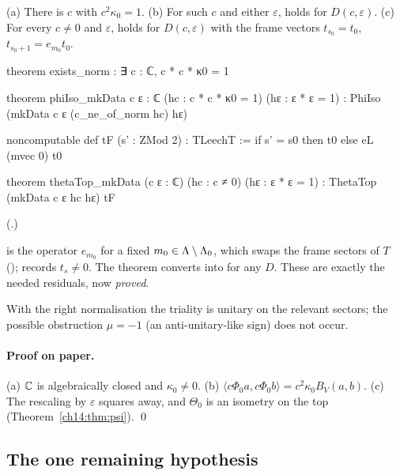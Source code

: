 \begin{theorem}\label{ch14:thm:isomk}
(a) There is $c$ with $c^2\kappa_0=1$.  (b) For such $c$ and either $\varepsilon$,  holds for
$D(c,\varepsilon)$.  (c) For every $c\ne0$ and $\varepsilon$,  holds for $D(c,\varepsilon)$ with the
frame vectors $t_{s_0}=t_0$, $t_{s_0+1}=e_{m_0}t_0$.
\end{theorem}
\begin{leancode}
theorem exists_norm : ∃ c : ℂ, c * c * κ0 = 1

theorem phiIso_mkData {c ε : ℂ} (hc : c * c * κ0 = 1) (hε : ε * ε = 1) :
    PhiIso (mkData c ε (c_ne_of_norm hc) hε)

noncomputable def tF (s' : ZMod 2) : TLeechT := if s' = s0 then t0 else eL (mvec 0) t0

theorem thetaTop_mkData (c ε : ℂ) (hc : c ≠ 0) (hε : ε * ε = 1) :
    ThetaTop (mkData c ε hc hε) tF
\end{leancode}
(.)

\begin{dictionary}
 is the operator $e_{m_0}$ for a fixed $m_0\in{\Lambda}\setminus{\Lambda}_0$, which swaps the frame
sectors of $T$ ();  records $t_{s}\ne0$.  The theorem 
converts  into  for any $D$.  These are exactly the needed residuals, now
\emph{proved}.
\end{dictionary}
\begin{physics}
With the right normalisation the triality is unitary on the relevant sectors; the possible obstruction $\mu=-1$ (an anti-unitary-like sign) does not occur.
\end{physics}


\paragraph{Proof on paper.}  (a) ${\mathbb{C}}$ is algebraically closed and $\kappa_0\ne0$.  (b)
$\langle c\Phi_0a,c\Phi_0b\rangle=c^2\kappa_0B_V(a,b)$.  (c) The rescaling by $\varepsilon$ squares away,
and $\Theta_0$ is an isometry on the top (Theorem~\ref{ch14:thm:psi}). \qed

\subsection{The one remaining hypothesis}

